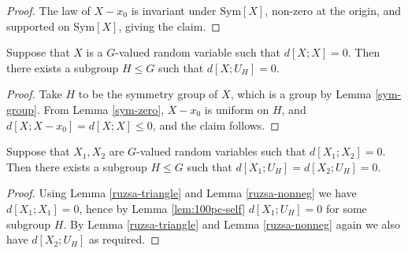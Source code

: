 \begin{proof}\leanok  The law of $X-x_0$ is invariant under $\mathrm{Sym}[X]$, non-zero at the origin, and supported on  $\mathrm{Sym}[X]$, giving the claim.
\end{proof}


\begin{lemma}\label{lem:100pc-self}
  \leanok
  Suppose that $X$ is a $G$-valued random variable such that
  $d[X ;X]=0$. Then there exists a subgroup $H \leq G$ such that $d[X ;U_H] = 0$.
\end{lemma}

\begin{proof}\leanok
Take $H$ to be the symmetry group of $X$, which is a group by Lemma \ref{sym-group}. From Lemma \ref{sym-zero}, $X-x_0$ is uniform on $H$, and $d[X ;X-x_0] = d[X ;X] \leq 0$, and the claim follows.
\end{proof}

\begin{corollary}\label{lem:100pc}
  \leanok
  Suppose that $X_1,X_2$ are $G$-valued random variables such that
  $d[X_1;X_2]=0$. Then there exists a subgroup $H \leq G$ such that $d[X_1;U_H] = d[X_2;U_H] = 0$.
\end{corollary}

\begin{proof}\leanok
Using Lemma \ref{ruzsa-triangle} and Lemma \ref{ruzsa-nonneg} we have $d[X_1;X_1]=0$, hence by Lemma \ref{lem:100pc-self} $d[X_1;U_H]=0$ for some subgroup $H$.  By Lemma \ref{ruzsa-triangle} and Lemma \ref{ruzsa-nonneg} again we also have $d[X_2;U_H]$ as required.
\end{proof}
